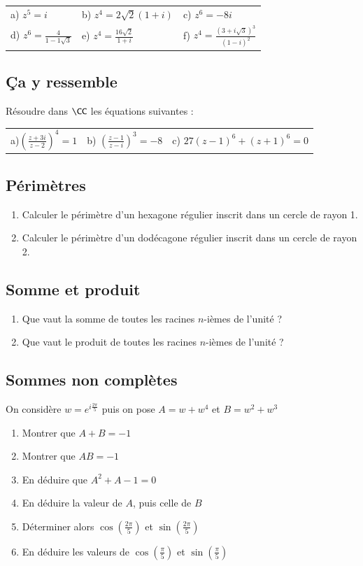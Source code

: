 \documentclass[oneside,12pt]{article}          %
\begin{document}
\begin{tabular}{p{} p{} p{}}
    a) $z^5=i$ & b) $z^4=2\sqrt{2}(1+i)$ & c)  $z^6=-8i$ \\
    d) $z^6=\frac{4}{1-1\sqrt{3}}$ & e) $z^4=\frac{16\sqrt{2}}{1+i}$ & f) $z^4=\frac{(3+i\sqrt{3})^3}{(1-i)^2}$
\end{tabular}


\subsection{Ça y ressemble}
Résoudre dans $\CC$ les équations suivantes :

\begin{tabular}{p{} p{} p{}}
    a)$\left(\frac{z+3i}{z-2}\right)^4=1$ & b) $\left(\frac{z-1}{z-i}\right)^3=-8$  & c) $27(z-1)^6+(z+1)^6=0$
\end{tabular}


\subsection{Périmètres}
\begin{enumerate}
    \item Calculer le périmètre d'un hexagone régulier inscrit dans un cercle de rayon 1.
    \item Calculer le périmètre d'un dodécagone régulier inscrit dans un cercle de rayon 2.
\end{enumerate}



\subsection{Somme et produit}
\begin{enumerate}
	\item Que vaut la somme de toutes les racines $n$-ièmes de l'unité ?
	\item Que vaut le produit de toutes les racines $n$-ièmes de l'unité ?
\end{enumerate}



\subsection{Sommes non complètes}
On considère $w=e^{i\frac{2\pi}{5}}$ puis on pose $A=w+w^4$ et $B=w^2+w^3$
\begin{enumerate}
	\item Montrer que $A+B=-1$
	\item Montrer que $AB=-1$
	\item En déduire que $A^2+A-1=0$
	\item En déduire la valeur de $A$, puis celle de $B$
	\item Déterminer alors $\cos\left(\frac{2\pi}{5}\right)$ et $\sin\left(\frac{2\pi}{5}\right)$
	\item En déduire les valeurs de $\cos\left(\frac{\pi}{5}\right)$ et $\sin\left(\frac{\pi}{5}\right)$
\end{enumerate}
\end{document}
